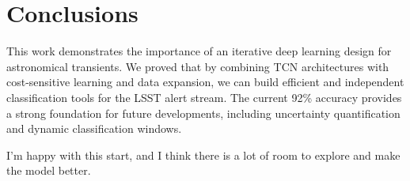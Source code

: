\documentclass[twocolumn, 10pt]{article} %
\begin{document}
\section{Conclusions}
This work demonstrates the importance of an iterative deep learning design for astronomical transients. We proved that by combining TCN architectures with cost-sensitive learning and data expansion, we can build efficient and independent classification tools for the LSST alert stream. The current 92\% accuracy provides a strong foundation for future developments, including uncertainty quantification and dynamic classification windows.

I'm happy with this start, and I think there is a lot of room to explore and make the model better.
\end{document}
